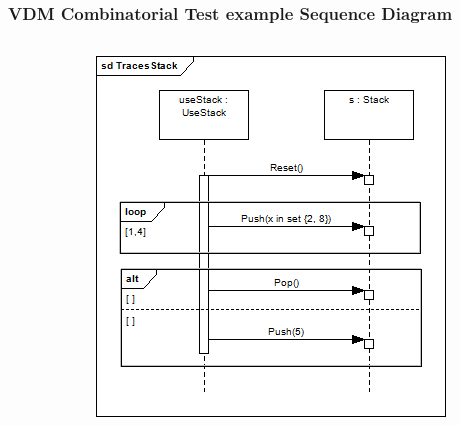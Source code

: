 %
%
\frame
{
  \frametitle{VDM Combinatorial Test example Sequence Diagram}
  
\begin{columns}
\begin{column}[l]{5cm}

	\begin{center}
	\end{center}

\end{column}
\begin{column}[r]{5cm}
	
	\begin{center}
	\includegraphics[width=\textwidth]{images/TracesSequenceDiagramEx2.png}%
	\end{center}

\end{column}
\end{columns}
  

}


